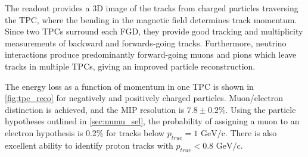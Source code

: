 The readout provides a 3D image of the tracks from charged particles traversing the TPC, where the bending in the magnetic field determines track momentum. Since two TPCs surround each FGD, they provide good tracking and multiplicity measurements of backward and forwards-going tracks. Furthermore, neutrino interactions produce predominantly forward-going muons and pions which leave tracks in multiple TPCs, giving an improved particle reconstruction.

The energy loss as a function of momentum in one TPC is shown in \autoref{fig:tpc_reco} for negatively and positively charged particles. Muon/electron distinction is achieved, and the MIP resolution is $7.8\pm0.2\%$. Using the particle hypotheses outlined in \autoref{sec:numu_sel}, the probability of assigning a muon to an electron hypothesis is 0.2\% for tracks below $p_{true}=1 \text{ GeV/c}$. There is also excellent ability to identify proton tracks with $p_{true} < 0.8 \text{ GeV/c}$\cite{thesis_tpc}.
